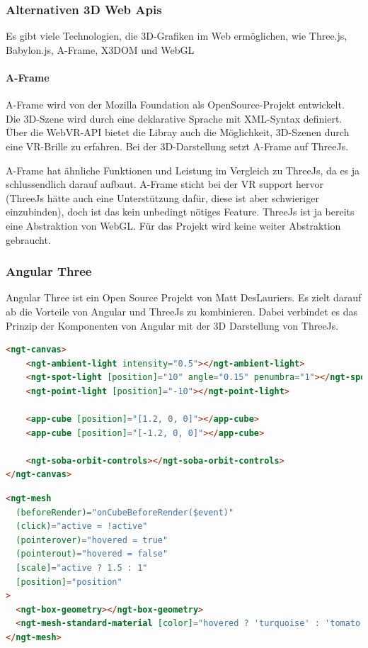 \subsubsection{Alternativen 3D Web Apis}
Es gibt viele Technologien, die 3D-Grafiken im Web ermöglichen, wie Three.js, Babylon.js, A-Frame, X3DOM und WebGL

\paragraph{A-Frame}
A-Frame wird von der Mozilla Foundation als OpenSource-Projekt entwickelt. Die 3D-Szene wird durch eine deklarative Sprache mit XML-Syntax definiert. Über die WebVR-API bietet die Libray auch die Möglichkeit, 3D-Szenen durch eine VR-Brille zu erfahren. Bei der 3D-Darstellung setzt A-Frame auf ThreeJs. \cite[A-Frame Wikipedia]{a-frame-wiki}

A-Frame hat ähnliche Funktionen und Leistung im Vergleich zu ThreeJs, da es ja schlussendlich darauf aufbaut. A-Frame sticht bei der VR support hervor (ThreeJs hätte auch eine Unterstützung dafür, diese ist aber schwieriger einzubinden), doch ist das kein unbedingt nötiges Feature. ThreeJs ist ja bereits eine Abstraktion von WebGL. Für das Projekt wird keine weiter Abstraktion gebraucht.

\subsubsection{Angular Three}
\label{ch:Technologien:AngularThree}
Angular Three ist ein Open Source Projekt von Matt DesLauriers. Es zielt darauf ab die Vorteile von Angular und ThreeJs zu kombinieren. Dabei verbindet es das Prinzip der Komponenten von Angular mit der 3D Darstellung von ThreeJs. 

\begin{lstlisting}[language=html,caption=Angular Three - Komponentenbasiertes 3D Scenen in HTML,label=lst:impl:AngularThreeExampleCode]
<ngt-canvas>
    <ngt-ambient-light intensity="0.5"></ngt-ambient-light>
    <ngt-spot-light [position]="10" angle="0.15" penumbra="1"></ngt-spot-light>
    <ngt-point-light [position]="-10"></ngt-point-light>
  
    <app-cube [position]="[1.2, 0, 0]"></app-cube>
    <app-cube [position]="[-1.2, 0, 0]"></app-cube>
  
    <ngt-soba-orbit-controls></ngt-soba-orbit-controls>
</ngt-canvas>
\end{lstlisting}

\begin{lstlisting}[language=html,caption=Angular Three - App Cube,label=lst:impl:AngularThreeCube]
<ngt-mesh
  (beforeRender)="onCubeBeforeRender($event)"
  (click)="active = !active"
  (pointerover)="hovered = true"
  (pointerout)="hovered = false"
  [scale]="active ? 1.5 : 1"
  [position]="position"
>
  <ngt-box-geometry></ngt-box-geometry>
  <ngt-mesh-standard-material [color]="hovered ? 'turquoise' : 'tomato'"></ngt-mesh-standard-material>
</ngt-mesh>
\end{lstlisting}

